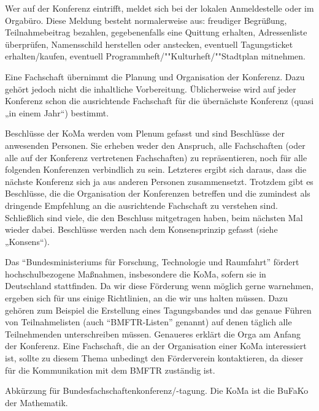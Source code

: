 \begin{description}
	Wer auf der Konferenz eintrifft, meldet sich bei der lokalen Anmeldestelle oder im Orgabüro. Diese Meldung besteht normalerweise aus: freudiger Begrüßung, Teilnahmebeitrag bezahlen, gegebenenfalls eine Quittung erhalten, Adressenliste überprüfen, Namensschild herstellen oder anstecken, eventuell Tagungsticket erhalten/kaufen, eventuell Programmheft/""Kulturheft/""Stadtplan mitnehmen.

\item[Ausrichtende Fachschaft]
    Eine Fachschaft übernimmt die Planung und Organisation der Konferenz. Dazu gehört jedoch nicht die inhaltliche Vorbereitung. Üblicherweise wird auf jeder Konferenz schon die ausrichtende Fachschaft für die übernächste Konferenz (quasi „in einem Jahr“) bestimmt.

\item[Beschlüsse]
    Beschlüsse der KoMa werden vom Plenum gefasst und sind Beschlüsse der anwesenden Personen. Sie erheben weder den Anspruch, alle Fachschaften (oder alle auf der Konferenz vertretenen Fachschaften) zu 	repräsentieren, noch für alle folgenden Konferenzen verbindlich zu sein. Letzteres ergibt sich daraus, dass die nächste Konferenz sich ja aus anderen Personen zusammensetzt. Trotzdem gibt es Beschlüsse, die die Organisation der Konferenzen betreffen und die zumindest als dringende Empfehlung an die ausrichtende Fachschaft zu verstehen sind. Schließlich sind viele, die den Beschluss mitgetragen haben, beim nächsten Mal wieder dabei. Beschlüsse werden nach dem Konsensprinzip gefasst (siehe „Konsens“).

\item[BMFTR]
    Das \enquote{Bundesministeriums für Forschung, Technologie und Raumfahrt} fördert hochschulbezogene Maßnahmen, insbesondere die KoMa, sofern sie in Deutschland stattfinden. Da wir diese Förderung wenn möglich gerne warnehmen, ergeben sich für uns einige Richtlinien, an die wir uns halten müssen. Dazu gehören zum Beispiel die Erstellung eines Tagungsbandes und das genaue Führen von Teilnahmelisten (auch \enquote{BMFTR-Listen} genannt) auf denen täglich alle Teilnehmenden unterschreiben müssen. Genaueres erklärt die Orga am Anfang der Konferenz. Eine Fachschaft, die an der Organisation einer KoMa interessiert ist, sollte zu diesem Thema unbedingt den Förderverein kontaktieren, da dieser für die Kommunikation mit dem BMFTR zuständig ist.

\item[BuFaKo, BuFaTa] Abkürzung für Bundesfachschaftenkonferenz/-tagung. Die KoMa ist die BuFaKo der Mathematik.


\end{description}
